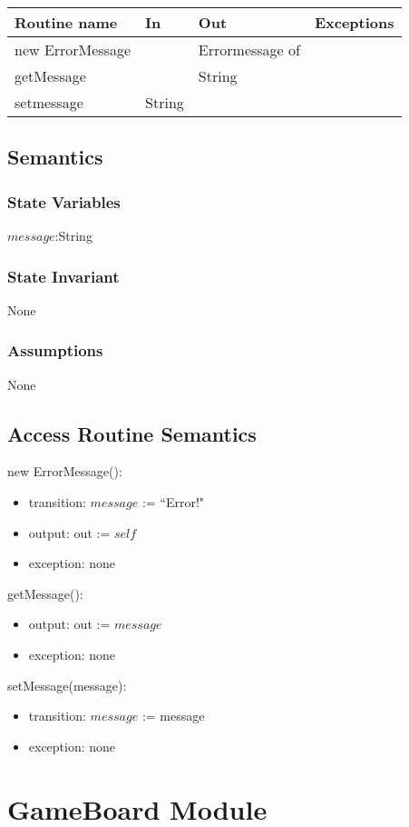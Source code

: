 \documentclass[12pt]{article}
\begin{document}
\begin{tabular}{| l | l | l | p{6cm} |}
\hline
\textbf{Routine name} & \textbf{In} & \textbf{Out} & \textbf{Exceptions}\\
\hline
new ErrorMessage & & Errormessage of  & \\
\hline
getMessage & &  String & \\
\hline
setmessage & String && \\
\hline
\end{tabular}

\subsection* {Semantics}
\subsubsection*{State Variables}
$message$:String
\subsubsection* {State Invariant}
None

\subsubsection* {Assumptions}
None

\subsection* {Access Routine Semantics}
new ErrorMessage():
\begin{itemize}
\item transition: $message$ := ``Error!"
\item output: out := $self$
\item exception: none
\end{itemize}
getMessage():
\begin{itemize}
\item output: out := $message$
\item exception: none
\end{itemize}
setMessage(message):
\begin{itemize}
\item transition: $message$ := message
\item exception: none
\end{itemize}

\newpage

%
\section*{GameBoard Module}
\end{document}
